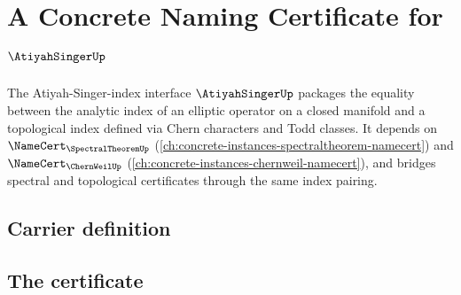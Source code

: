\chapter{A Concrete Naming Certificate for $\AtiyahSingerUp$}
\label{ch:concrete-instances-atiyahsinger-namecert}

The Atiyah-Singer-index interface $\AtiyahSingerUp$ packages the equality between the analytic index of an elliptic operator on a closed manifold and a topological index defined via Chern characters and Todd classes. It depends on $\NameCert_{\SpectralTheoremUp}$ (\autoref{ch:concrete-instances-spectraltheorem-namecert}) and $\NameCert_{\ChernWeilUp}$ (\autoref{ch:concrete-instances-chernweil-namecert}), and bridges spectral and topological certificates through the same index pairing.

\section{Carrier definition}
\label{sec:atiyahsinger-carrier}

\section{The certificate}
\label{sec:atiyahsinger-certificate}

